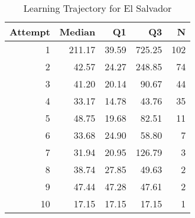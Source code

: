 \begin{table}[htbp]
\centering
\caption{Learning Trajectory for El Salvador}
\label{tab:learning-trajectory}
\begin{tabular}{rrrrr}
\toprule
Attempt & Median & Q1 & Q3 & N \\
\midrule
1 & 211.17 & 39.59 & 725.25 & 102 \\
2 & 42.57 & 24.27 & 248.85 & 74 \\
3 & 41.20 & 20.14 & 90.67 & 44 \\
4 & 33.17 & 14.78 & 43.76 & 35 \\
5 & 48.75 & 19.68 & 82.51 & 11 \\
6 & 33.68 & 24.90 & 58.80 & 7 \\
7 & 31.94 & 20.95 & 126.79 & 3 \\
8 & 38.74 & 27.85 & 49.63 & 2 \\
9 & 47.44 & 47.28 & 47.61 & 2 \\
10 & 17.15 & 17.15 & 17.15 & 1 \\
\bottomrule
\end{tabular}
\end{table}